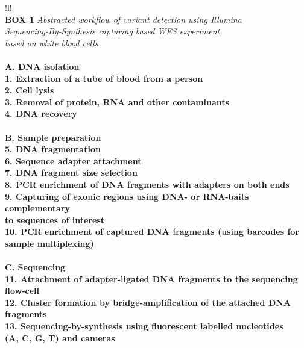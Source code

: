 \begin{table}[H] %
	\newcommand\setrow[1]{\gdef\rowmac{#1}#1\ignorespaces}
	\begin{minipage}{\textwidth}
		\begin{tabular}{!{\color{deeporange}\VRule[3pt]}l!{\color{deeporange}\VRule[3pt]}}
			\noalign{\global\arrayrulewidth=3pt}
			\hline
			\\
			\textbf{BOX 1} \textsl{Abstracted workflow of variant detection using Illumina} \\ \textsl{Sequencing-By-Synthesis capturing based WES experiment,} \\ \textsl{based on white blood cells} \\
			\hline
			\\
			\setrow{\bfseries}A. DNA isolation \\
			1.	Extraction of a tube of blood from a person \\
			2.	Cell lysis \\
			3.	Removal of protein, RNA and other contaminants \\
			4.	DNA recovery \\
			\\
			\setrow{\bfseries}B. Sample preparation \\
			5.	DNA fragmentation \\
			6.	Sequence adapter attachment \\
			7.	DNA fragment size selection \\
			8.	PCR enrichment of DNA fragments with adapters on both ends \\
			9.	Capturing of exonic regions using DNA- or RNA-baits complementary \\ to sequences of interest \\
			10.	PCR enrichment of captured DNA fragments (using barcodes for \\ sample multiplexing) \\
			\\
			\setrow{\bfseries}C. Sequencing \\
			11.	Attachment of adapter-ligated DNA fragments to the sequencing \\ flow-cell \\
			12.	Cluster formation by bridge-amplification of the attached DNA \\ fragments \\
			13.	Sequencing-by-synthesis using fluorescent labelled nucleotides \\ (A, C, G, T) and cameras \\

\end{tabular}
\end{minipage}
\end{table}
